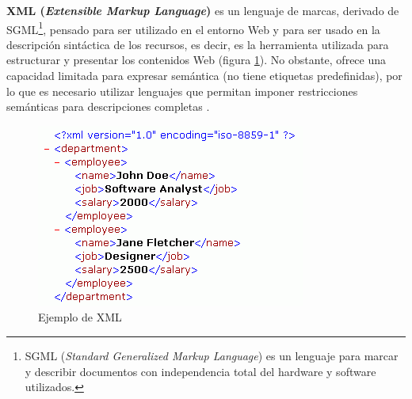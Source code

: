 


\textbf{XML (\textit{Extensible Markup Language})} es un lenguaje de marcas, derivado de SGML\footnote{SGML (\textit{Standard Generalized Markup Language}) es un lenguaje para marcar y describir documentos con independencia total del hardware y software utilizados.}, pensado para ser utilizado en el entorno Web y para ser usado en la descripción sintáctica de los recursos, es decir, es la herramienta utilizada para estructurar y presentar los contenidos Web (figura \ref{fig:xml}). No obstante, ofrece una capacidad limitada para expresar semántica (no tiene etiquetas predefinidas), por lo que es necesario utilizar lenguajes que permitan imponer restricciones semánticas para descripciones completas \cite{aplicacion}.

\begin{figure}[H]
	\centering
	\includegraphics[width=0.65\linewidth]{imagenes/capitulo3/xml}
	\caption{Ejemplo de XML \cite{imagen-xml}}
	\label{fig:xml}
\end{figure}





